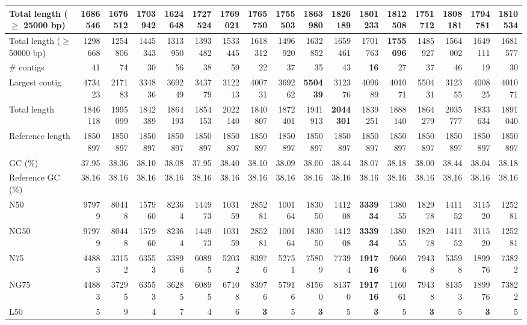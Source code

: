 \documentclass[12pt,a4paper]{article}
\begin{document}
\begin{table}[ht]
\begin{center}
\begin{tabular}{|l*{16}{|r}|}
Total length ($\geq$ 25000 bp) & 1686546 & 1676512 & 1703942 & 1624648 & 1727524 & 1769021 & 1765750 & 1755503 & {\bf 1863980} & 1826189 & 1801233 & 1812508 & 1751712 & 1808181 & 1794781 & 1810534 \\ \hline
Total length ($\geq$ 50000 bp) & 1298668 & 1254806 & 1445343 & 1313950 & 1393482 & 1533445 & 1618312 & 1496920 & 1632852 & 1659461 & 1701763 & {\bf 1755696} & 1485927 & 1564002 & 1649111 & 1681577 \\ \hline
\# contigs & 41 & 74 & 30 & 56 & 38 & 59 & 22 & 37 & 35 & 43 & {\bf 16} & 27 & 37 & 46 & 19 & 30 \\ \hline
Largest contig & 473423 & 217183 & 334836 & 369249 & 343779 & 312213 & 400731 & 369262 & {\bf 550439} & 312376 & 409689 & 401071 & 550431 & 312355 & 400825 & 401071 \\ \hline
Total length & 1846118 & 1995099 & 1842389 & 1864193 & 1854153 & 2022140 & 1840807 & 1872401 & 1941913 & {\bf 2044301} & 1839251 & 1888140 & 1864279 & 2035777 & 1833634 & 1891040 \\ \hline
Reference length & 1850897 & 1850897 & 1850897 & 1850897 & 1850897 & 1850897 & 1850897 & 1850897 & 1850897 & 1850897 & 1850897 & 1850897 & 1850897 & 1850897 & 1850897 & 1850897 \\ \hline
GC (\%) & 37.95 & 38.36 & 38.10 & 38.08 & 37.95 & 38.40 & 38.10 & 38.09 & 38.00 & 38.44 & 38.07 & 38.18 & 38.00 & 38.44 & 38.04 & 38.18 \\ \hline
Reference GC (\%) & 38.16 & 38.16 & 38.16 & 38.16 & 38.16 & 38.16 & 38.16 & 38.16 & 38.16 & 38.16 & 38.16 & 38.16 & 38.16 & 38.16 & 38.16 & 38.16 \\ \hline
N50 & 97979 & 80448 & 157960 & 82364 & 144973 & 103159 & 285281 & 100164 & 183050 & 141208 & {\bf 333934} & 138055 & 182978 & 141152 & 311520 & 125281 \\ \hline
NG50 & 97979 & 80448 & 157960 & 82364 & 144973 & 103159 & 285281 & 100164 & 183050 & 141208 & {\bf 333934} & 138055 & 182978 & 141152 & 311520 & 125281 \\ \hline
N75 & 44883 & 33152 & 63553 & 33896 & 60895 & 52032 & 83976 & 52751 & 75809 & 77394 & {\bf 191716} & 96606 & 79438 & 53598 & 189976 & 73822 \\ \hline
NG75 & 44883 & 37295 & 63553 & 36285 & 60895 & 67108 & 83976 & 57916 & 81560 & 81370 & {\bf 191716} & 116061 & 79438 & 81353 & 189976 & 73822 \\ \hline
L50 & 5 & 9 & 4 & 7 & 4 & 6 & {\bf 3} & 5 & {\bf 3} & 5 & {\bf 3} & 5 & {\bf 3} & 5 & {\bf 3} & 5 \\ \hline

\end{tabular}
\end{center}
\end{table}
\end{document}
